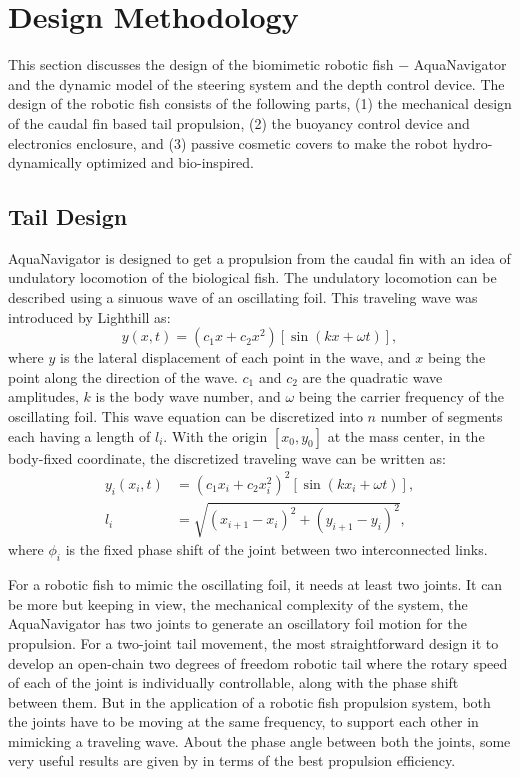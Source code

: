 \documentclass[pdflatex,sn-mathphys-num]{sn-jnl}
\theoremstyle{thmstyleone}%
\begin{document}
\section{Design Methodology}\label{methodology}
\par This section discusses the design of the biomimetic robotic fish $-$ AquaNavigator and the dynamic model of the steering system and the depth control device. The design of the robotic fish consists of the following parts, (1) the mechanical design of the caudal fin based tail propulsion, (2) the buoyancy control device and electronics enclosure, and (3) passive cosmetic covers to make the robot hydro-dynamically optimized and bio-inspired.
\subsection{Tail Design}
AquaNavigator is designed to get a propulsion from the caudal fin with an idea of undulatory locomotion of the biological fish. The undulatory locomotion can be described using a sinuous wave of an oscillating foil. This traveling wave was introduced by Lighthill \cite{lighthill1969hydromechanics} as:
\begin{equation}
    y(x, t) = (c_1 x + c_2 x^2) \left[ \sin(kx + \omega t) \right],
\end{equation}
where $y$ is the lateral displacement of each point in the wave, and $x$ being the point along the direction of the wave. $c_1$ and $c_2$ are the quadratic wave amplitudes, $k$ is the body wave number, and $\omega$ being the carrier frequency of the oscillating foil.  This wave equation can be discretized into $n$ number of segments each having a length of $l_i$. With the origin $[x_0,y_0]$ at the mass center, in the body-fixed coordinate, the discretized traveling wave can be written as:
\begin{equation}
    \begin{aligned}
        y_i(x_i, t) &= \left( c_1 x_i + c_2 x_i^2 \right)^2 \left[ \sin \left( k x_i + \omega t \right) \right], \\
        l_i &= \sqrt{ \left( x_{i+1} - x_i \right)^2 + \left( y_{i+1} - y_i \right)^2 },
    \end{aligned}
\end{equation}
where $\phi_i$ is the fixed phase shift of the joint between two interconnected links.\par
For a robotic fish to mimic the oscillating foil, it needs at least two joints. It can be more but keeping in view, the mechanical complexity of the system, the AquaNavigator has two joints to generate an oscillatory foil motion for the propulsion. For a two-joint tail movement, the most straightforward design it to develop an open-chain two degrees of freedom robotic tail where the rotary speed of each of the joint is individually controllable, along with the phase shift between them. But in the application of a robotic fish propulsion system, both the joints have to be moving at the same frequency, to support each other in mimicking a traveling wave. About the phase angle between both the joints, some very useful results are given by \cite{Park2012} in terms of the best propulsion efficiency. 
\end{document}
